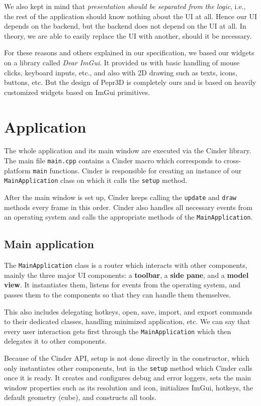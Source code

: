 We also kept in mind that \emph{presentation should be separated from the logic}, i.e., the rest of the application should know nothing about the UI at all.
Hence our UI depends on the backend, but the backend does not depend on the UI at all.
In theory, we are able to easily replace the UI with another, should it be necessary.

For these reasons and others explained in our specification, we based our widgets on a library called \emph{Dear ImGui}.
It provided us with basic handling of mouse clicks, keyboard inputs, etc., and also with 2D drawing such as texts, icons, buttons, etc.
But the design of Pepr3D is completely ours and is based on heavily customized widgets based on ImGui primitives.

\section{Application}

The whole application and its main window are executed via the Cinder library.
The main file \texttt{main.cpp} contains a Cinder macro which corresponds to cross-platform \texttt{main} functions.
Cinder is responsible for creating an instance of our \texttt{MainApplication} class on which it calls the \texttt{setup} method.

After the main window is set up, Cinder keeps calling the \texttt{update} and \texttt{draw} methods every frame in this order.
Cinder also handles all necessary events from an operating system and calls the appropriate methods of the \texttt{MainApplication}.

\subsection{Main application}

The \texttt{MainApplication} class is a router which interacts with other components, mainly the three major UI components: a \textbf{toolbar}, a \textbf{side pane}, and a \textbf{model view}.
It instantiates them, listens for events from the operating system, and passes them to the components so that they can handle them themselves.

This also includes delegating hotkeys, open, save, import, and export commands to their dedicated classes, handling minimized application, etc.
We can say that every user interaction gets first through the \texttt{MainApplication} which then delegates it to other components.

Because of the Cinder API, setup is not done directly in the constructor, which only instantiates other components, but in the \texttt{setup} method which Cinder calls once it is ready.
It creates and configures debug and error loggers, sets the main window properties such as its resolution and icon, initializes ImGui, hotkeys, the default geometry (cube), and constructs all tools.

